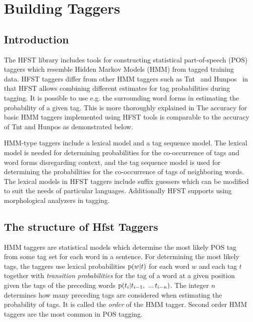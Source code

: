 \documentclass{llncs}
\begin{document}


\section{Building Taggers}\label{PosTools}

\subsection{Introduction}

The HFST library includes tools for constructing statistical
part-of-speech (POS) taggers which resemble Hidden Markov Models (HMM) from
tagged training data. HFST taggers differ from other HMM taggers such
as Tnt~\cite{Brants:2000} and Hunpos~\cite{Halascy:2007} in that HFST
allows combining different estimates for tag probabilities during
tagging. It is possible to use e.g. the surrounding word forms in
estimating the probability of a given tag. This is more thoroughly
explained in \cite{silfverberg/2010/icetal,silfverberg/2011/nodalida} The
accuracy for basic HMM taggers implemented using HFST tools is
comparable to the accuracy of Tnt and Hunpos as demonstrated below.

HMM-type taggers include a lexical model and a tag sequence model. The
lexical model is needed for determining probabilities for the
co-occurrence of tags and word forms disregarding context, and the tag
sequence model is used for determining the probabilities for the
co-occurrence of tags of neighboring words. The lexical models in
HFST taggers include suffix guessers which can be modified to suit
the needs of particular languages. Additionally HFST supports using
morphological analyzers in tagging.

\subsection{The structure of Hfst Taggers}

HMM taggers are statistical models which determine the most likely
POS tag from some tag set for each word in a sentence. For
determining the most likely tags, the taggers use
lexical probabilities ${\rm p}(w|t)$ for each word $w$ and each tag
$t$ together with \emph{transition probabilities} for the tag of a
word at a given position given the tags of the preceding words ${\rm
  p}(t_i | t_{i - 1},\ ...\, t_{i-n})$. The integer $n$ determines how
many preceding tags are considered when estimating the probability of
tags. It is called the \emph{order} of the HMM tagger. Second order HMM
taggers are the most common in POS tagging.
\end{document}
